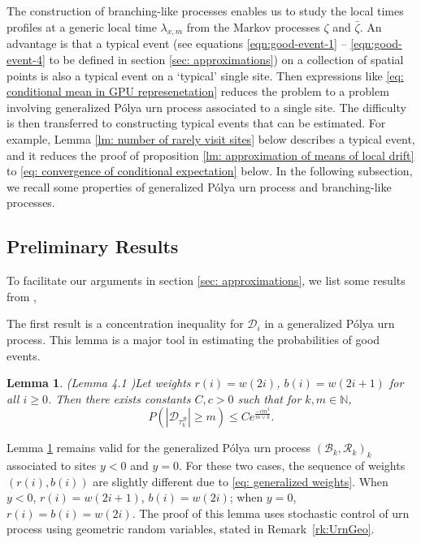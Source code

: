 \documentclass[twoside,12pt, a4paper]{article}
\newtheorem{lemma}{Lemma}[section]
\numberwithin{equation}{section}
\theoremstyle{remark}
\newcommand{\abs}[1]{\left\vert #1 \right\vert}
\begin{document}
	
	
	The construction of branching-like processes enables us to study the local times profiles at a generic local time $\lambda_{x,m}$ from the Markov processes $\zeta$ and $\bar{\zeta}$. An advantage is that a typical event ({see equations \eqref{eqn:good-event-1} -- \eqref{eqn:good-event-4} to be defined in section \ref{sec: approximations}}) on a collection of spatial points is also a typical event on a `typical' single site. Then expressions like \eqref{eq: conditional mean in GPU represenetation} reduces the problem to a problem involving generalized P\'{o}lya urn process associated to a single site. The difficulty is then transferred to constructing typical events that can be estimated. For example, Lemma \ref{lm: number of rarely visit sites} below describes a typical event, and it reduces the proof of proposition \ref{lm: approximation of means of local drift} to \eqref{eq: convergence of conditional expectation} below. In the following subsection, we recall some properties of generalized P\'{o}lya urn process and branching-like processes.
	
	\subsection{Preliminary Results}
	To facilitate our arguments in section \ref{sec: approximations}, we list some results from \cite{KMP23,T96}, 
	
	The first result is a concentration inequality for $\mathcal{D}_i$ in a generalized P\'{o}lya urn process. This lemma is a major tool in estimating the probabilities of good events.
	\begin{lemma}(Lemma 4.1 \cite{KMP23})\label{lm: concentration inequality}
		Let weights $r(i) = w(2i)$, $b(i)= w(2i+1) $ for all $i\geq 0$. Then there exists constants $C,c>0$ such that for $k, m \in \mathbb{N}$,
		$$
		P\left(  \abs{ \mathcal{D}_{\tau_k^{\mathcal{B}}}   } \geq m \right) \leq C e^{\frac{-cm^2}{m \vee k}}.
		$$
	\end{lemma} 
	Lemma \ref{lm: concentration inequality} remains valid for the generalized P\'{o}lya urn process $(\mathcal{B}_{k},\mathcal{R}_{k})_k$ associated to sites $y<0$ and $y=0$. For these two cases, the sequence of weights $(r(i),b(i))$ are slightly different due to \eqref{eq: generalized weights}. When $y<0$, $r(i) = w(2i+1)$, $b(i)= w(2i) $; when $y=0$, $r(i) = b(i)=w(2i)$. The proof of this lemma uses stochastic control of urn process using geometric random variables, stated in Remark~\ref{rk:UrnGeo}.
\end{document}
